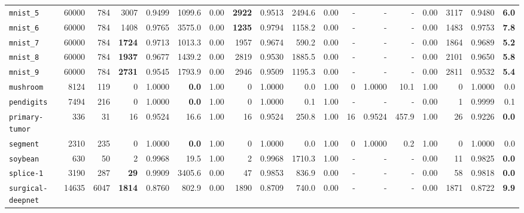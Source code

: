 \begin{tabular}{lccrrrrrrrrrrrrrrr}
\texttt{mnist\_5} & \multicolumn{1}{r}{60000} & \multicolumn{1}{r}{784}  & 3007 & 0.9499 & 1099.6 & 0.00 & \textbf{2922} & 0.9513 & 2494.6 & 0.00 & - & - & - & 0.00 & 3117 & 0.9480 & \textbf{6.0}\\
\texttt{mnist\_6} & \multicolumn{1}{r}{60000} & \multicolumn{1}{r}{784}  & 1408 & 0.9765 & 3575.0 & 0.00 & \textbf{1235} & 0.9794 & 1158.2 & 0.00 & - & - & - & 0.00 & 1483 & 0.9753 & \textbf{7.8}\\
\texttt{mnist\_7} & \multicolumn{1}{r}{60000} & \multicolumn{1}{r}{784}  & \textbf{1724} & 0.9713 & 1013.3 & 0.00 & 1957 & 0.9674 & 590.2 & 0.00 & - & - & - & 0.00 & 1864 & 0.9689 & \textbf{5.2}\\
\texttt{mnist\_8} & \multicolumn{1}{r}{60000} & \multicolumn{1}{r}{784}  & \textbf{1937} & 0.9677 & 1439.2 & 0.00 & 2819 & 0.9530 & 1885.5 & 0.00 & - & - & - & 0.00 & 2101 & 0.9650 & \textbf{5.8}\\
\texttt{mnist\_9} & \multicolumn{1}{r}{60000} & \multicolumn{1}{r}{784}  & \textbf{2731} & 0.9545 & 1793.9 & 0.00 & 2946 & 0.9509 & 1195.3 & 0.00 & - & - & - & 0.00 & 2811 & 0.9532 & \textbf{5.4}\\
\texttt{mushroom} & \multicolumn{1}{r}{8124} & \multicolumn{1}{r}{119}  & 0 & 1.0000 & \textbf{0.0} & 1.00 & 0 & 1.0000 & 0.0 & 1.00 & 0 & 1.0000 & 10.1 & 1.00 & 0 & 1.0000 & 0.0\\
\texttt{pendigits} & \multicolumn{1}{r}{7494} & \multicolumn{1}{r}{216}  & 0 & 1.0000 & \textbf{0.0} & 1.00 & 0 & 1.0000 & 0.1 & 1.00 & - & - & - & 0.00 & 1 & 0.9999 & 0.1\\
\texttt{primary-tumor} & \multicolumn{1}{r}{336} & \multicolumn{1}{r}{31}  & 16 & 0.9524 & 16.6 & 1.00 & 16 & 0.9524 & 250.8 & 1.00 & 16 & 0.9524 & 457.9 & 1.00 & 26 & 0.9226 & \textbf{0.0}\\
\texttt{segment} & \multicolumn{1}{r}{2310} & \multicolumn{1}{r}{235}  & 0 & 1.0000 & \textbf{0.0} & 1.00 & 0 & 1.0000 & 0.0 & 1.00 & 0 & 1.0000 & 0.2 & 1.00 & 0 & 1.0000 & 0.0\\
\texttt{soybean} & \multicolumn{1}{r}{630} & \multicolumn{1}{r}{50}  & 2 & 0.9968 & 19.5 & 1.00 & 2 & 0.9968 & 1710.3 & 1.00 & - & - & - & 0.00 & 11 & 0.9825 & \textbf{0.0}\\
\texttt{splice-1} & \multicolumn{1}{r}{3190} & \multicolumn{1}{r}{287}  & \textbf{29} & 0.9909 & 3405.6 & 0.00 & 47 & 0.9853 & 836.9 & 0.00 & - & - & - & 0.00 & 58 & 0.9818 & \textbf{0.0}\\
\texttt{surgical-deepnet} & \multicolumn{1}{r}{14635} & \multicolumn{1}{r}{6047}  & \textbf{1814} & 0.8760 & 802.9 & 0.00 & 1890 & 0.8709 & 740.0 & 0.00 & - & - & - & 0.00 & 1871 & 0.8722 & \textbf{9.9}\\

\end{tabular}
